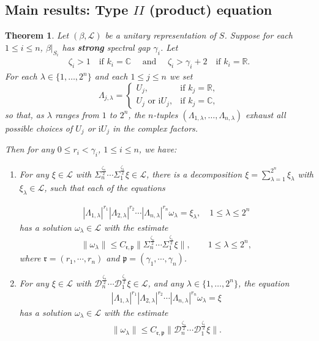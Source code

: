 \documentclass[11 pt]{amsart}
\newcommand{\RR}{\mathbb{R}}
\newcommand{\CC}{\mathbb{C}}
\newcommand{\norm}[1]{\lVert#1\rVert}
\newtheorem{theorem}{Theorem}[section]
\theoremstyle{definition}
\numberwithin{equation}{section}
\begin{document}
\subsection{Main results: Type $II$ (product) equation}

\begin{theorem}\label{th:6}Let $(\beta,\mathcal{L})$ be a unitary representation of $S$. Suppose for each $1\leq i\leq n$, $\beta|_{S_i}$ has \textbf{strong} spectral gap $\gamma_i$. Let
\begin{align*}
 \zeta_i>1 \quad\text{if } k_i = \CC \quad\text{ and }\quad\zeta_i>\gamma_i+2 \quad\text{if } k_i = \RR.
\end{align*}
For each $\lambda\in\{1,\dots,2^n\}$ and each $1\le j\le n$ we set
\[
  \Lambda_{j,\lambda}=
  \begin{cases}
    U_j, & \text{if } k_j=\RR,\\[4pt]
    U_j \text{ or } \mathrm{i}U_j, & \text{if } k_j=\CC,
  \end{cases}
\]
so that, as $\lambda$ ranges from $1$ to $2^n$, the $n$-tuples
$(\Lambda_{1,\lambda},\dots,\Lambda_{n,\lambda})$ exhaust all possible choices
of $U_j$ or $\mathrm{i}U_j$ in the complex factors.


Then for any $0\leq r_i<\gamma_i$, $1\leq i\leq n$, we have:
\begin{enumerate}
  \item\label{for:82} For any $\xi\in \mathcal{L}$ with $\Sigma_n^{\frac{\zeta_n}{2}}\cdots\Sigma_1^{\frac{\zeta_1}{2}}\xi\in\mathcal{L}$, there is a decomposition $\xi=\sum_{\lambda=1}^{2^n}\xi_\lambda$ with $\xi_\lambda\in \mathcal{L}$, such that each of the equations

\begin{align*}
|\Lambda_{1,\lambda}|^{r_1}|\Lambda_{2,\lambda}|^{r_2}\cdots |\Lambda_{n,\lambda}|^{r_n}\omega_\lambda=\xi_\lambda, \quad 1\leq \lambda\leq 2^n
\end{align*}
 has a solution $\omega_\lambda\in \mathcal{L}$ with the estimate
\begin{align*}
\norm{\omega_\lambda} \leq C_{\mathfrak{r},\mathfrak{p}} \big\|\Sigma_n^{\frac{\zeta_n}{2}}\cdots\Sigma_1^{\frac{\zeta_1}{2}}\xi\big\|,\qquad 1\leq\lambda\leq 2^n,
\end{align*}
where $\mathfrak{r}=(r_1,\cdots, r_n)$ and $\mathfrak{p}=(\gamma_1,\cdots, \gamma_n)$.

\smallskip
\item\label{for:277} For any $\xi\in \mathcal{L}$ with $\mathcal{D}_n^{\frac{\zeta_n}{2}}\cdots\mathcal{D}_1^{\frac{\zeta_1}{2}}\xi\in\mathcal{L}$, and any $\lambda\in\{1,\dots,2^n\}$, the equation
\begin{align*}
|\Lambda_{1,\lambda}|^{r_1}|\Lambda_{2,\lambda}|^{r_2}\cdots |\Lambda_{n,\lambda}|^{r_n}\omega_\lambda=\xi
\end{align*}
 has a solution $\omega_\lambda\in \mathcal{L}$ with the estimate
\begin{align*}
\norm{\omega_\lambda} \leq C_{\mathfrak{r},\mathfrak{p}} \big\|\mathcal{D}_n^{\frac{\zeta_n}{2}}\cdots\mathcal{D}_1^{\frac{\zeta_1}{2}}\xi\big\|.
\end{align*}




\end{enumerate}
\end{theorem}
\end{document}
